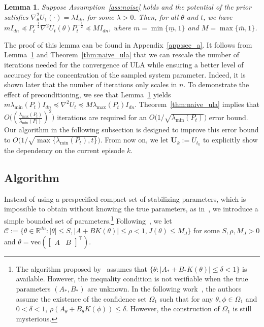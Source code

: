 \documentclass[11pt]{article}
\theoremstyle{plain}
\newtheorem{lem}[thm]{Lemma}
\theoremstyle{definition}
\theoremstyle{remark}
\begin{document}
\begin{lem}\label{concavity}
Suppose Assumption~\ref{ass:noise} holds and the potential of the prior satisfies $\nabla^2_\theta U_1(\cdot)= \lambda I_{dn}$ for some $\lambda>0$. Then, for all $\theta$ and $t$, we have
$m I_{dn} \preceq  P_t^{-\frac{1}{2}}\nabla^2 U_t(\theta)P_t^{-\frac{1}{2}}  \preceq M I_{dn}$,
where $m=\min\{ \underline m, 1\}$ and $M = \max\{\overline m, 1\}$.
\end{lem}
The proof of this lemma can be found in Appendix~\ref{app:sec_a}.  It follows from Lemma~\ref{concavity} and Theorem~\ref{thm:naive_ula} that we can rescale the number of
iterations needed for the convergence of ULA while ensuring a better level of accuracy for the
 concentration of the sampled system parameter. Indeed, it is shown later that the number of iterations only scales in $n$. To demonstrate the effect of preconditioning, we see that Lemma~\ref{concavity} yields 
 $ m \lambda_{\min} (P_t)I_{dn} \preceq \nabla^2 U_t \preceq M \lambda_{\max}(P_t)I_{dn}$.
 Theorem~\ref{thm:naive_ula} implies that $O\big ( (\frac{\lambda_{\max} (P_t)}{\lambda_{\min} (P_t)})^2 \big )$ iterations are required for an $O\big ({1}/{\sqrt{\lambda_{\min} (P_t)}} \big )$ error bound.
 Our algorithm in the following subsection is designed to improve this error bound to $O\big ({1}/{\sqrt{\max\{\lambda_{\min} (P_t),t\}}}\big )$.
From now on, we let  $\mathbf{U}_k := U_{t_k}$ to explicitly show the dependency on the current episode $k$.


\subsection{Algorithm}\label{sec:alg}

Instead of using a prespecified compact set of stabilizing parameters, which is impossible to obtain without knowing the true parameters, 
 as in~\cite{ouyang2019posterior,gagrani2022modified}, we introduce a simple bounded set of parameters.\footnote{The algorithm proposed by~\cite{ouyang2019posterior} assumes that 
 $\{ \theta : |A_* + B_* K(\theta)| \leq \delta < 1\}$ is available. 
However, the inequality condition is not verifiable when the true parameters $(A_*,B_*)$ are unknown. In the following work~\cite{gagrani2022modified}, the authors assume the existence of the confidence set $\Omega_1$ such that for any $\theta, \phi \in \Omega_1$ and $0<\delta<1$, $\rho(A_{\theta}+B_{\theta}K(\phi))\leq \delta$. However, the construction of $\Omega_1$ is still mysterious. } 
Following~\cite{abeille2018improved},  
we let $\mathcal{C}:=\{\theta \in \mathbb{R}^{dn}:|\theta|\leq S,|A+BK(\theta)|\leq \rho<1, J(\theta)\leq M_J\}$ for some $S,\rho,M_J>0$ and ${\theta} = \mathrm{vec}(\begin{bmatrix} 
A & B
\end{bmatrix}^{\top})$. 
\end{document}
